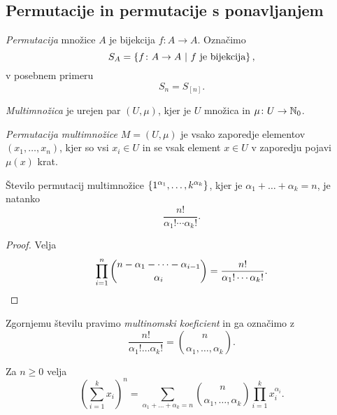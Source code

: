 \newpage

\subsection{Permutacije in permutacije s ponavljanjem}

\begin{definicija}
\emph{Permutacija} množice $A$ je bijekcija
$f \colon A \to A$. Označimo
\[
S_A = \left\{f \colon A \to A~\middle\vert~\text{$f$ je bijekcija}\right\},
\]
v posebnem primeru
\[
S_n = S_{[n]}.
\]
\end{definicija}


\begin{definicija}
\emph{Multimnožica} je urejen par $(U, \mu)$,
kjer je $U$ množica in $\mu \colon U \to \mathbb{N}_0$.
\end{definicija}

\begin{definicija}
\emph{Permutacija multimnožice}
$M = (U, \mu)$ je vsako zaporedje elementov $(x_1, \dots, x_n)$,
kjer so vsi $x_i \in U$ in se vsak element $x \in U$ v zaporedju
pojavi $\mu(x)$ krat.
\end{definicija}

\begin{trditev}
Število permutacij multimnožice
$\left\{1^{\alpha_1}, \dots, k^{\alpha_k}\right\}$, kjer je
$\alpha_1 + \dots + \alpha_k = n$, je natanko
\[
\frac{n!}{\alpha_1! \cdots \alpha_k!}.
\]
\end{trditev}

\begin{proof}
Velja
\[
\prod_{i=1}^{n}
\binom{n - \alpha_1 - \dots - \alpha_{i-1}}{\alpha_i} =
\frac{n!}{\alpha_1! \cdots \alpha_k!}. \qedhere
\]
\end{proof}

\begin{opomba}
Zgornjemu številu pravimo
\emph{multinomski koeficient} in ga
označimo z
\[
\frac{n!}{\alpha_1! \dots \alpha_k!} =
\binom{n}{\alpha_1, \dots, \alpha_k}.
\]
\end{opomba}

\begin{izrek}[Multinomski]
Za $n \geq 0$ velja
\[
\left(\sum_{i=1}^k x_i\right)^n =
\sum_{\alpha_1+\dots+\alpha_k = n}
\binom{n}{\alpha_1, \dots, \alpha_k} \prod_{i=1}^k x_i^{\alpha_i}.
\]
\end{izrek}

